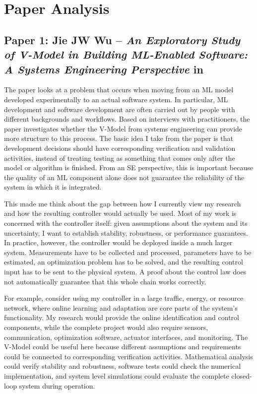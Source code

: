 \documentclass[11pt,a4paper]{article}
\begin{document}
\section{Paper Analysis}
\label{sec:paper-analysis}

\subsection{Paper 1: Jie JW Wu -- \emph{An Exploratory Study of V-Model in Building ML-Enabled Software: A Systems Engineering Perspective} in~\cite{wu2024exploratory}}

The paper looks at a problem that occurs when moving from an ML model developed experimentally to an actual software system. In particular, ML development and software development are often carried out by people with different backgrounds and workflows. Based on interviews with practitioners, the paper investigates whether the V-Model from systems engineering can provide more structure to this process. The basic idea I take from the paper is that development decisions should have corresponding verification and validation activities, instead of treating testing as something that comes only after the model or algorithm is finished. From an SE perspective, this is important because the quality of an ML component alone does not guarantee the reliability of the system in which it is integrated.

This made me think about the gap between how I currently view my research and how the resulting controller would actually be used. Most of my work is concerned with the controller itself: given assumptions about the system and its uncertainty, I want to establish stability, robustness, or performance guarantees. In practice, however, the controller would be deployed inside a much larger system. Measurements have to be collected and processed, parameters have to be estimated, an optimization problem has to be solved, and the resulting control input has to be sent to the physical system. A proof about the control law does not automatically guarantee that this whole chain works correctly.

For example, consider using my controller in a large traffic, energy, or resource network, where online learning and adaptation are core parts of the system's functionality. My research would provide the online identification and control components, while the complete project would also require sensors, communication, optimization software, actuator interfaces, and monitoring. The V-Model could be useful here because different assumptions and requirements could be connected to corresponding verification activities. Mathematical analysis could verify stability and robustness, software tests could check the numerical implementation, and system level simulations could evaluate the complete closed-loop system during operation.
\end{document}
